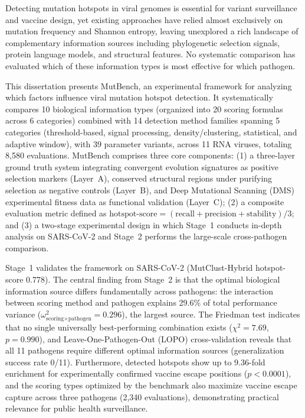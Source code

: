 Detecting mutation hotspots in viral genomes is essential for variant surveillance and vaccine design, yet existing approaches have relied almost exclusively on mutation frequency and Shannon entropy, leaving unexplored a rich landscape of complementary information sources including phylogenetic selection signals, protein language models, and structural features. No systematic comparison has evaluated which of these information types is most effective for which pathogen.

This dissertation presents MutBench, an experimental framework for analyzing which factors influence viral mutation hotspot detection. It systematically compares 10 biological information types (organized into 20 scoring formulas across 6 categories) combined with 14 detection method families spanning 5 categories (threshold-based, signal processing, density/clustering, statistical, and adaptive window), with 39 parameter variants, across 11 RNA viruses, totaling 8{,}580 evaluations.
MutBench comprises three core components:
(1) a three-layer ground truth system integrating convergent evolution signatures as positive selection markers (Layer~A), conserved structural regions under purifying selection as negative controls (Layer~B), and Deep Mutational Scanning (DMS) experimental fitness data as functional validation (Layer~C);
(2) a composite evaluation metric defined as $\text{hotspot-score} = (\text{recall} + \text{precision} + \text{stability}) / 3$; and
(3) a two-stage experimental design in which Stage~1 conducts in-depth analysis on SARS-CoV-2 and Stage~2 performs the large-scale cross-pathogen comparison.

Stage~1 validates the framework on SARS-CoV-2 (MutClust-Hybrid hotspot-score 0.778).
The central finding from Stage~2 is that the optimal biological information source differs fundamentally across pathogens: the interaction between scoring method and pathogen explains 29.6\% of total performance variance ($\omega^2_{\text{scoring} \times \text{pathogen}} = 0.296$), the largest source. The Friedman test indicates that no single universally best-performing combination exists ($\chi^2 = 7.69$, $p = 0.990$), and Leave-One-Pathogen-Out (LOPO) cross-validation reveals that all 11 pathogens require different optimal information sources (generalization success rate 0/11).
Furthermore, detected hotspots show up to 9.36-fold enrichment for experimentally confirmed vaccine escape positions ($p < 0.0001$), and the scoring types optimized by the benchmark also maximize vaccine escape capture across three pathogens (2{,}340 evaluations), demonstrating practical relevance for public health surveillance.

